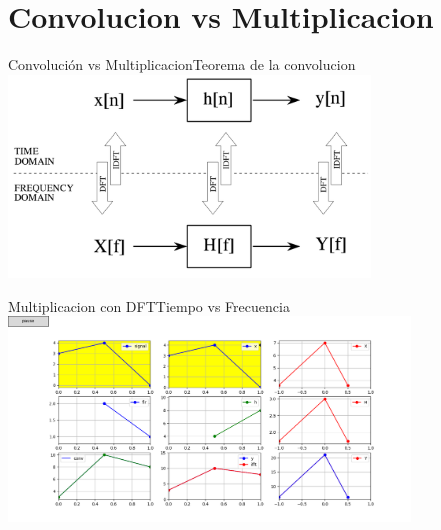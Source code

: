\section{Convolucion vs Multiplicacion}
\begin{frame}[t]{Convolución vs Multiplicacion}{Teorema de la convolucion}
   \center\includegraphics[width=0.72\textwidth]{5_clase/dft_apps}
   \vfill
\end{frame}
\begin{frame}{Multiplicacion con DFT}{Tiempo vs Frecuencia}
   \centering\includegraphics[width=0.8\textwidth]{5_clase/conv_vs_dft1}
   \vfill
\end{frame}
